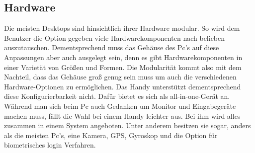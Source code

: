 \subsection{Hardware}\myCheckmark
Die meisten Desktops sind hinsichtlich ihrer Hardware modular. %
	So wird dem Benutzer die Option gegeben viele Hardwarekomponenten nach belieben auszutauschen. %
	Dementsprechend muss das Gehäuse des Pc's auf diese Anpassungen aber auch ausgelegt sein, denn es gibt Hardwarekomponenten in einer Varietät von Größen und Formen. Die Modularität kommt also mit dem Nachteil, dass das Gehäuse groß genug sein muss um auch die verschiedenen Hardware-Optionen zu ermöglichen.\newline%
Das Handy unterstützt dementsprechend diese Konfigurierbarkeit nicht. Dafür bietet es sich als all-in-one-Gerät an. %
	Während man sich beim Pc auch Gedanken um Monitor und Eingabegeräte machen muss, fällt die Wahl bei einem Handy leichter aus. Bei ihm wird alles zusammen in einem System angeboten. Unter anderem besitzen sie sogar, anders als die meisten Pc's, eine Kamera, GPS, Gyroskop und die Option für biometrisches login Verfahren.\newline%
	
	
	
